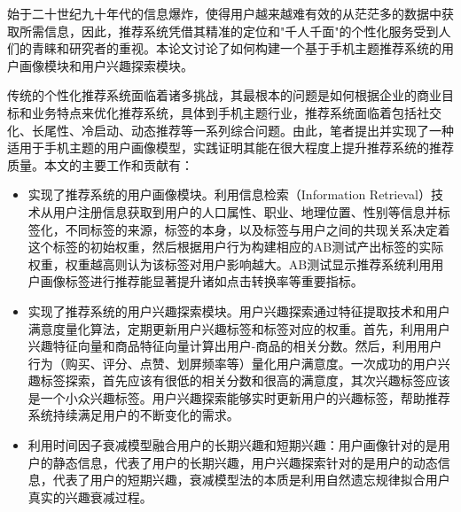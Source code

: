 \begin{cnabstract}
始于二十世纪九十年代的信息爆炸，使得用户越来越难有效的从茫茫多的数据中获取所需信息，因此，推荐系统凭借其精准的定位和"千人千面"的个性化服务受到人们的青睐和研究者的重视。本论文讨论了如何构建一个基于手机主题推荐系统的用户画像模块和用户兴趣探索模块。

传统的个性化推荐系统面临着诸多挑战，其最根本的问题是如何根据企业的商业目标和业务特点来优化推荐系统，具体到手机主题行业，推荐系统面临着包括社交化、长尾性、冷启动、动态推荐等一系列综合问题。由此，笔者提出并实现了一种适用于手机主题的用户画像模型，实践证明其能在很大程度上提升推荐系统的推荐质量。本文的主要工作和贡献有：
\begin{itemize}
	\item 实现了推荐系统的用户画像模块。利用信息检索（Information Retrieval）技术从用户注册信息获取到用户的人口属性、职业、地理位置、性别等信息并标签化，不同标签的来源，标签的本身，以及标签与用户之间的共现关系决定着这个标签的初始权重，然后根据用户行为构建相应的AB测试产出标签的实际权重，权重越高则认为该标签对用户影响越大。AB测试显示推荐系统利用用户画像标签进行推荐能显著提升诸如点击转换率等重要指标。
	\item 实现了推荐系统的用户兴趣探索模块。用户兴趣探索通过特征提取技术和用户满意度量化算法，定期更新用户兴趣标签和标签对应的权重。首先，利用用户兴趣特征向量和商品特征向量计算出用户-商品的相关分数。然后，利用用户行为（购买、评分、点赞、划屏频率等）量化用户满意度。一次成功的用户兴趣标签探索，首先应该有很低的相关分数和很高的满意度，其次兴趣标签应该是一个小众兴趣标签。用户兴趣探索能够实时更新用户的兴趣标签，帮助推荐系统持续满足用户的不断变化的需求。
	\item 利用时间因子衰减模型融合用户的长期兴趣和短期兴趣：用户画像针对的是用户的静态信息，代表了用户的长期兴趣，用户兴趣探索针对的是用户的动态信息，代表了用户的短期兴趣，衰减模型法的本质是利用自然遗忘规律拟合用户真实的兴趣衰减过程。
\end{itemize}

\end{cnabstract}


